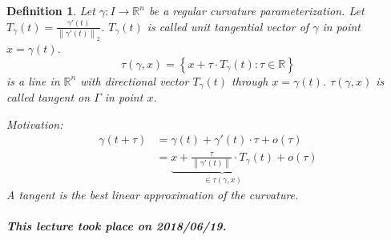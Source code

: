 \documentclass{article}
\newtheorem{definition}{Definition}  \numberwithin{definition}{section}
\newcommand{\set}[1]{\left\{#1\right\}}
\newcommand{\norm}[1]{\left\|#1\right\|}
\newcommand{\dateref}[1]{\paragraph{\textit{This lecture took place on #1.}}}
\begin{document}
\begin{definition} %
  Let $\gamma: I \to \mathbb R^n$ be a regular curvature parameterization.
  Let $T_\gamma(t) = \frac{\gamma'(t)}{\norm{\gamma'(t)}_2}$.
  $T_\gamma(t)$ is called \emph{unit tangential vector} of $\gamma$ in point $x = \gamma(t)$.
  \[ \tau(\gamma, x) = \set{x + \tau \cdot T_{\gamma}(t): \tau \in \mathbb R} \]
  is a line in $\mathbb R^n$ with directional vector $T_\gamma(t)$ through $x = \gamma(t)$.
  $\tau(\gamma, x)$ is called \emph{tangent} on $\Gamma$ in point $x$.


  Motivation:
  \begin{align*}
    \gamma(t + \tau) &= \gamma(t) + \gamma'(t) \cdot \tau + o(\tau) \\
      &= \underbrace{x + \frac{\tau}{\norm{\gamma'(t)}} \cdot T_{\gamma}(t)}_{\in \tau(\gamma, x)} + o(\tau)
  \end{align*}
  A tangent is the best linear approximation of the curvature.
\end{definition}

\dateref{2018/06/19}
\end{document}

